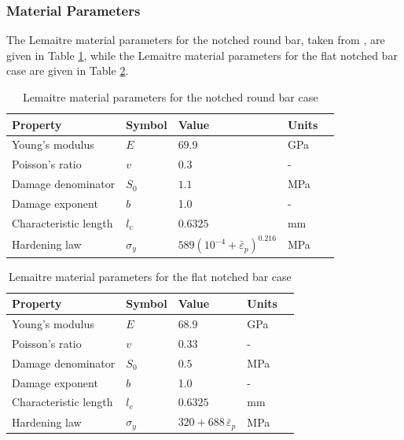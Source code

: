\documentclass[sn-mathphys,Numbered,draft]{sn-jnl}%
\begin{document}
\subsubsection{Material Parameters}

The Lemaitre material parameters for the notched round bar, taken from \citet{cesar_de_sa_damage_2006}, are given in Table \ref{table:NRB_material_properties_lemaitre}, while the Lemaitre material parameters for the flat notched bar case are given in Table \ref{table:FNB_material_properties_lemaitre}.
\begin{table}[htb]
	\centering
		\begin{tabular}{lllll} \hline
			Property & Symbol & Value & Units \\ \hline 
			Young's modulus & $E$ & $69.9$ & GPa \\
			Poisson's ratio & $v$ & $0.3$  & - \\
			Damage denominator & $S_0$ & $1.1$ & MPa  \\
			Damage exponent & $b$ & 1.0 & - \\
			Characteristic length & $l_c$ & $0.6325$ & mm  \\
			Hardening law & $\sigma_y$ & $589({10^{-4} +\bar{\varepsilon}}_p)^{0.216}$ & MPa \\
			\hline
		\end{tabular}
	\caption{Lemaitre material parameters for the notched round bar case}
	\label{table:NRB_material_properties_lemaitre}
\end{table}
\begin{table}[htb]
	\centering
		\begin{tabular}{lllll} \hline
			Property & Symbol & Value & Units  \\ \hline 
			Young's modulus & $E$ & $68.9$ & GPa \\
			Poisson's ratio & $v$ & $0.33$  & - \\
			Damage denominator & $S_0$ & $0.5$ & MPa  \\
			Damage exponent & $b$ & 1.0 & -  \\
			Characteristic length & $l_c$ & $0.6325$ & mm  \\
			Hardening law & $\sigma_y$ & $320+688 \, \bar{\varepsilon}_p$ & MPa \\
			\hline
		\end{tabular}
	\caption{Lemaitre material parameters for the flat notched bar case}
	\label{table:FNB_material_properties_lemaitre}
\end{table}
\end{document}
